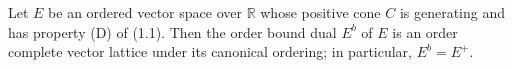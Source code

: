 Let $E$ be an ordered vector space over $\mathbb{R}$ whose positive cone $C$ is generating and has property (D) of (1.1). Then the order bound dual $E^b$ of $E$ is an order complete vector lattice under its canonical ordering; in particular, $E^b = E^+$.
